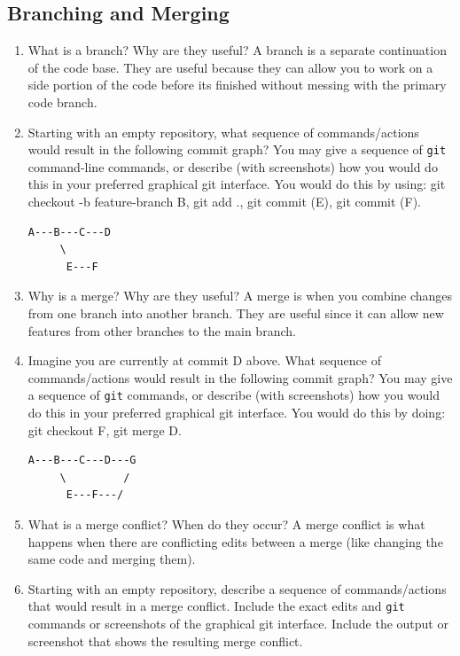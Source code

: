 \documentclass[10pt,twocolumn]{article}
\begin{document}
\subsection{Branching and Merging}

\begin{enumerate}
\item What is a branch? Why are they useful?
\subitem A branch is a separate continuation of the code base. They are useful because they can allow you to work on a side portion of the code before its finished without messing with the primary code branch.

\item Starting with an empty repository, what sequence of commands/actions would result in the following commit graph? You may give a sequence of \texttt{git} command-line commands, or describe (with screenshots) how you would do this in your preferred graphical git interface.
\subitem You would do this by using: git checkout -b feature-branch B, git add ., git commit (E), git commit (F). 

\begin{verbatim}
A---B---C---D
     \
      E---F
\end{verbatim}


\item Why is a merge? Why are they useful?
\subitem A merge is when you combine changes from one branch into another branch. They are useful since it can allow new features from other branches to the main branch.


\item Imagine you are currently at commit D above. What sequence of commands/actions would result in the following commit graph? You may give a sequence of \texttt{git} commands, or describe (with screenshots) how you would do this in your preferred graphical git interface.
\subitem You would do this by doing: git checkout F, git merge D.

\begin{verbatim}
A---B---C---D---G
     \         /
      E---F---/
\end{verbatim}
\item What is a merge conflict? When do they occur?
\subitem A merge conflict is what happens when there are conflicting edits between a merge (like changing the same code and merging them).


\item Starting with an empty repository, describe a sequence of commands/actions that would result in a merge conflict. Include the exact edits and \texttt{git} commands or screenshots of the graphical git interface. Include the output or screenshot that shows the resulting merge conflict.


\end{enumerate}
\end{document}
